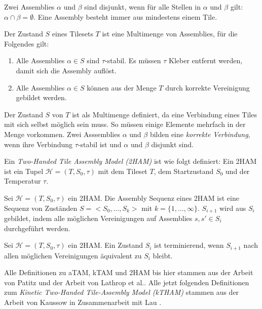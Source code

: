 \begin{definition}
	Zwei Assemblies $\alpha$ und $\beta$ sind disjunkt, wenn für alle Stellen in $\alpha$ und $\beta$ gilt: $\alpha\cap\beta = \emptyset$. Eine Assembly besteht immer aus mindestens einem Tile.
\end{definition}

\begin{definition}
	Der Zustand $S$ eines Tilesets $T$ ist eine Multimenge von Assemblies, für die Folgendes gilt:
	\begin{enumerate}
		\item Alle Assemblies $\alpha\in S$ sind $\tau$-stabil. Es müssen $\tau$ Kleber entfernt werden, damit sich die Assembly auflöst. 
		\item Alle Assemblies $\alpha\in S$ können aus der Menge $T$ durch korrekte Vereinigung gebildet werden.
	\end{enumerate}
\end{definition}

Der Zustand $S$ von $T$ ist als Multimenge definiert, da eine Verbindung eines Tiles mit sich selbst möglich sein muss. 
So müssen einige Elemente mehrfach in der Menge vorkommen. 
Zwei Asssemblies $\alpha$ und $\beta$ bilden eine \emph{korrekte Verbindung}, wenn ihre Verbindung $\tau$-stabil ist und $\alpha$ und $\beta$ disjunkt sind.

\begin{definition}
	Ein \emph{Two-Handed Tile Assembly Model (2HAM)} ist wie folgt definiert: Ein 2HAM ist ein Tupel $\mathcal{H} = (T,S_0,\tau)$ mit dem Tileset $T$, dem Startzustand $S_0$ und der Temperatur $\tau$.
\end{definition}
\begin{definition}
	Sei $\mathcal{H} = (T,S_0,\tau)$ ein 2HAM. Die Assembly Sequenz eines 2HAM ist eine Sequenz von Zuständen $S=<S_0,\dots,S_k>$ mit $k=\{1,\dots,\infty\}$. $S_{i+1}$ wird aus $S_i$ gebildet, indem alle möglichen Vereinigungen auf Assemblies $s,s'\in S_i$ durchgeführt werden.
\end{definition}
\begin{definition}
	Sei $\mathcal{H} = (T,S_0,\tau)$ ein 2HAM. Ein Zustand $S_i$ ist terminierend, wenn $S_{i+1}$ nach allen möglichen Vereinigungen äquivalent zu $S_i$ bleibt.
\end{definition}

Alle Definitionen zu aTAM, kTAM und 2HAM bis hier stammen aus der Arbeit von Patitz \cite{patitz2014introduction} und der Arbeit von Lathrop et al.\cite{lathrop2009strict}. Alle jetzt folgenden Definitionen zum \emph{Kinetic Two-Handed Tile-Assembly Model (kTHAM)} stammen aus der Arbeit von Kaussow in Zusammenarbeit mit Lau \cite{kaussow2022thesis}.

